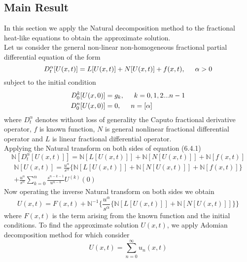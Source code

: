 \subsection{Main Result}
In this section we apply the Natural decomposition method to the fractional heat-like equations to obtain the approximate solution.\\
Let us consider the general non-linear non-homogeneous fractional partial differential equation of the form
\begin{equation}
D_{t}^{\alpha}[U(x,t)]= L[U(x,t)] + N[U(x,t)]+f(x,t),\hspace{0.5cm} \alpha > 0
\end{equation}
subject to the initial condition
\begin{align*}
D_{0}^{k}[U(x,0)]&= g_{k},\hspace{0.5cm} k=0,1,2...n-1\\
D_{0}^{n}[U(x,0)]&= 0,\hspace{0.5cm} n=[\alpha]
\end{align*}
where $ D_{t}^{\alpha} $ denotes without loss of generality the Caputo fractional derivative operator, $f$ is known function, $N$ is general nonlinear fractional differential operator and $L$ is linear fractional differential operator.\\
Applying the Natural transform on both sides of equation (6.4.1)
\begin{equation*}
\mathbb{N}[D_{t}^{\alpha}[U(x,t)]]= \mathbb{N}[L[U(x,t)]] + \mathbb{N}[N[U(x,t)]]+\mathbb{N}[f(x,t)]
\end{equation*}
\begin{eqnarray*}
\mathbb{N}[U(x,t)]=\frac{u^{\alpha}}{s^{\alpha}}\lbrace\mathbb{N}[L[U(x,t)]] + \mathbb{N}[N[U(x,t)]]+\mathbb{N}[f(x,t)]\rbrace\\
+\frac{u^{\alpha}}{s^{\alpha}}\sum_{k=0}^{n}\frac{s^{n-k-1}}{u^{n-k}}U^{(k)}(0)
\end{eqnarray*}
Now operating the inverse Natural transform on both sides we obtain
\begin{equation}
U(x,t)= F(x,t)+\mathbb{N}^{-1}\lbrace\frac{u^{\alpha}}{s^{\alpha}}\lbrace\mathbb{N}[L[U(x,t)]] + \mathbb{N}[N[U(x,t)]]\rbrace\rbrace
\end{equation}
where $F(x,t)$ is the term arising from the known function and the initial conditions. To find the approximate solution $U(x,t)$, we apply Adomian decomposition method for which consider
\begin{equation}
U(x,t)= \sum_{n=0}^{\infty}u_{n}(x,t)
\end{equation}
